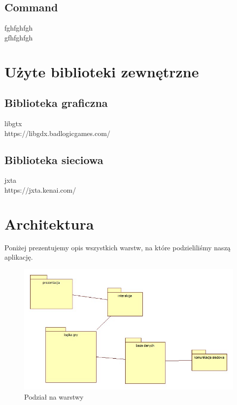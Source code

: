 \documentclass[a4paper, 11pt]{article}
\begin{document}
	\subsection{Command}
		fghfghfgh\\gfhfghfgh
	\section{Użyte biblioteki zewnętrzne}
	\subsection{Biblioteka graficzna}
	libgtx\\
	 https://libgdx.badlogicgames.com/
	\subsection{Biblioteka sieciowa}
	jxta\\
	https://jxta.kenai.com/
	\section{Architektura}
	\indent
	
	Poniżej prezentujemy opis wszystkich warstw, na które podzieliliśmy naszą aplikację.
	\begin{figure}[H]%
		\includegraphics[scale=0.5]{uml/main.jpg}\caption{Podział na warstwy}
	\end{figure}
\end{document}
